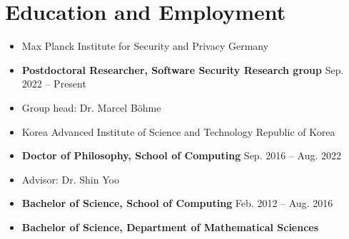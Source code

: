 \documentclass[letterpaper,11pt]{article}
\makeatletter
\newcommand{\resumeSubheading}[4]{
  \vspace{-2pt}\item
    \begin{tabular*}{1.0\textwidth}[t]{l@{\extracolsep{\fill}}r}
      \textbf{#1} & \textbf{\small #2} \\
      \textit{\small#3} & \textit{\small #4} \\
    \end{tabular*}\vspace{-7pt}
}
\newcommand{\resumeSubHeadingListStart}{\begin{itemize}[leftmargin=0.0in, label={}]}
\newcommand{\resumeSubHeadingListEnd}{\end{itemize}}
\makeatother
\begin{document}
\section{Education and Employment}
\resumeSubHeadingListStart
\vspace{-2pt}
\item Max Planck Institute for Security and Privacy \hfill Germany \vspace{-2pt}
\vspace{-2pt} \item \hspace{10pt} \textbf{Postdoctoral Researcher, Software Security Research group} \hfill  Sep. 2022 -- Present
\vspace{-5pt} \item \hspace{20pt} Group head: Dr. Marcel Böhme

\vspace{-2pt}
\item Korea Advanced Institute of Science and Technology \hfill Republic of Korea \vspace{-2pt}
\vspace{-2pt} \item \hspace{10pt} \textbf{Doctor of Philosophy, School of Computing} \hfill  Sep. 2016 -- Aug. 2022
\vspace{-5pt} \item \hspace{20pt} Advisor: Dr. Shin Yoo

\vspace{-2pt} \item \hspace{10pt} \textbf{Bachelor of Science, School of Computing} \hfill  Feb. 2012 -- Aug. 2016
\vspace{-5pt} \item \hspace{10pt} \textbf{Bachelor of Science, Department of Mathematical Sciences}
\resumeSubHeadingListEnd
\end{document}
